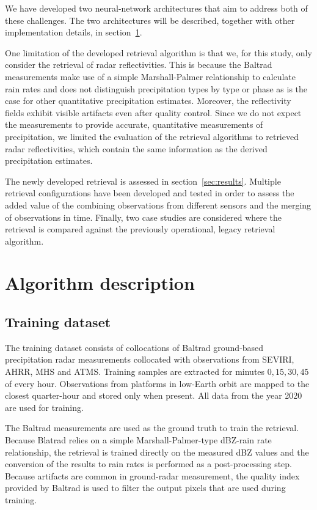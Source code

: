 \documentclass[11pt]{scrartcl}
\begin{document}
We have developed two neural-network architectures that aim to address both
of these challenges. The two architectures will be described, together with
other implementation details, in section~\ref{sec:method}.

One limitation of the developed retrieval algorithm is that we, for this
study, only consider the retrieval of radar reflectivities. This is because
the Baltrad measurements make use of a simple Marshall-Palmer relationship
to calculate rain rates and does not distinguish precipitation types by
type or phase as is the case for other quantitative precipitation estimates.
Moreover, the reflectivity fields exhibit visible artifacts even after quality
control. Since we do not expect the measurements to provide accurate,
quantitative measurements of precipitation, we limited the evaluation of
the retrieval algorithms to retrieved radar reflectivities, which contain
the same information as the derived precipitation estimates.

The newly developed retrieval is assessed in section~\ref{sec:results}. Multiple
retrieval configurations have been developed and tested in order to assess the
added value of the combining observations from different sensors and the merging
of observations in time. Finally, two case studies are considered where the
retrieval is compared against the previously operational, legacy retrieval
algorithm.


\section{Algorithm description}
\label{sec:method}


\subsection{Training dataset}
\label{sec:org4dcfa76}

The training dataset consists of collocations of Baltrad ground-based
precipitation radar measurements collocated with observations from SEVIRI, AHRR,
MHS and ATMS. Training samples are extracted for minutes \(0, 15, 30, 45\) of
every hour. Observations from platforms in low-Earth orbit are mapped to the
closest quarter-hour and stored only when present. All data from the year 2020
are used for training.

The Baltrad measurements are used as the ground truth to train the retrieval.
Because Blatrad relies on a simple Marshall-Palmer-type dBZ-rain rate relationship,
the retrieval is trained directly on the measured dBZ values and the conversion
of the results to rain rates is performed as a post-processing step. Because
artifacts are common in ground-radar measurement, the quality index provided by
Baltrad is used to filter the output pixels that are used during training.
\end{document}
